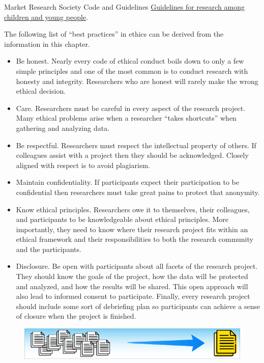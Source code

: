 Market Research Society Code and Guidelines  \href{http://www.mrs.org.uk/pdf/2012-02-23%20Children%20and%20Young%20People%20Research%20Guidelines.pdf}{Guidelines for research among children and young people}.




The following list of ``best practices'' in ethics can be derived from the information in this chapter.

\begin{itemize}

	\item Be honest. Nearly every code of ethical conduct boils down to only a few simple principles and one of the most common is to conduct research with honesty and integrity. Researchers who are honest will rarely make the wrong ethical decision.
	\item Care. Researchers must be careful in every aspect of the research project. Many ethical problems arise when a researcher ``takes shortcuts'' when gathering and analyzing data.
	\item Be respectful. Researchers must respect the intellectual property of others. If colleagues assist with a project then they should be acknowledged. Closely aligned with respect is to avoid plagiarism.
	\item Maintain confidentiality. If participants expect their participation to be confidential then researchers must take great pains to protect that anonymity.  
	\item Know ethical principles. Researchers owe it to themselves, their colleagues, and participants to be knowledgeable about ethical principles. More importantly, they need to know where their research project fits within an ethical framework and their responsibilities to both the research community and the participants.
	\item Disclosure. Be open with participants about all facets of the research project. They should know the goals of the project, how the data will be protected and analyzed, and how the results will be shared. This open approach will also lead to informed consent to participate. Finally, every research project should include some sort of debriefing plan so participants can achieve a sense of closure when the project is finished.
\end{itemize}

\begin{figure}[H]
	\centering
	\includegraphics[width=\maxwidth{.95\linewidth}]{gfx/Sampling_Of_Research}
	\caption*{}
	\label{03:sampling_of_research}
\end{figure}
